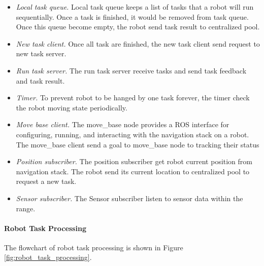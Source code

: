 \begin{itemize}
	\item \textsl{Local task queue.} Local task queue keeps a list of tasks that a robot will run sequentially. Once a task is finished, it would be removed from task queue. Once this queue become empty, the robot send task result to centralized pool.
	\item \textsl{New task client.} Once all task are finished, the new task client send request to new task server.
	\item \textsl{Run task server.} The run task server receive tasks and send task feedback and task result.
	\item \textsl{Timer.} To prevent robot to be hanged by one task forever, the timer check the robot moving state periodically.
	\item \textsl{Move base client.} The move\_base node provides a ROS interface for configuring, running, and interacting with the navigation stack on a robot. The move\_base client send a goal to move\_base node to tracking their status  
	\item \textsl{Position subscriber.} The position subscriber get robot current position from navigation stack. The robot send its current location to centralized pool to request a new task.
	\item \textsl{Sensor subscriber.} The Sensor subscriber listen to sensor data within the range.
\end{itemize}

\paragraph{Robot Task Processing} The flowchart of robot task processing is shown in Figure \ref{fig:robot_task_processing}.

